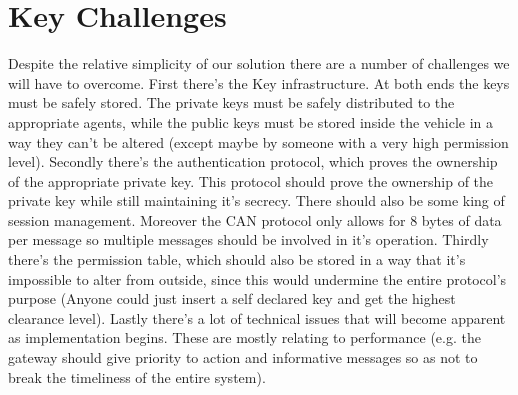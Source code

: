 \documentclass[11pt]{article}
\begin{document}
\section{Key Challenges}

Despite the relative simplicity of our solution there are a number of challenges we will have to overcome. First there's the Key infrastructure. At both ends the keys must be safely stored. The private keys must be safely distributed to the appropriate agents, while the public keys must be stored inside the vehicle in a way they can't be altered (except maybe by someone with a very high permission level). Secondly there's the authentication protocol, which proves the ownership of the appropriate private key. This protocol should prove the ownership of the private key while still maintaining it's secrecy. There should also be some king of session management. Moreover the CAN protocol only allows for 8 bytes of data per message so multiple messages should be involved in it's operation. Thirdly there's the permission table, which should also be stored in a way that it's impossible to alter from outside, since this would undermine the entire protocol's purpose (Anyone could just insert a self declared key and get the highest clearance level). Lastly there's a lot of technical issues that will become apparent as implementation begins. These are mostly relating to performance (e.g. the gateway should give priority to action and informative messages so as not to break the timeliness of the entire system).
\end{document}
